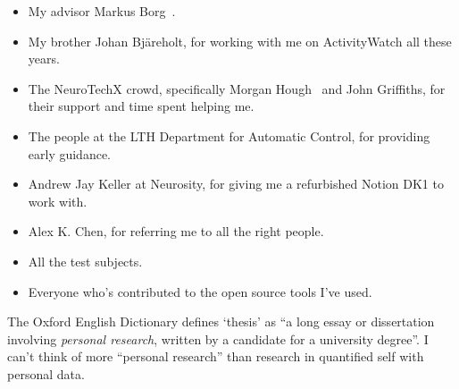 \documentclass[a4paper]{article}
\begin{document}
\begin{refsection}
\begin{itemize}
 \item My advisor Markus Borg~.
 \item My brother Johan Bjäreholt, for working with me on ActivityWatch all these years.
 \item The NeuroTechX crowd, specifically Morgan Hough~ and John Griffiths, for their support and time spent helping me.
 \item The people at the LTH Department for Automatic Control, for providing early guidance.
 \item Andrew Jay Keller at Neurosity, for giving me a refurbished Notion DK1 to work with.
 \item Alex K. Chen, for referring me to all the right people.
 \item All the test subjects.
 \item Everyone who's contributed to the open source tools I've used.
\end{itemize}

    The Oxford English Dictionary defines `thesis' as ``a long essay or dissertation involving \emph{personal research}, written by a candidate for a university degree''. I can't think of more ``personal research'' than research in quantified self with personal data.


\printbibliography[category=cited]

\nocite{*}
  {\list{}
     {\setlength{\leftmargin}{\bibhang}%
      \setlength{\itemindent}{-\leftmargin}%
      \setlength{\itemsep}{\bibitemsep}%
      \setlength{\parsep}{\bibparsep}}
  }
  {\endlist}
  {\item}
\printbibliography[notcategory=cited, env=bibnonum, heading=notcited]

\end{refsection}
\end{document}
